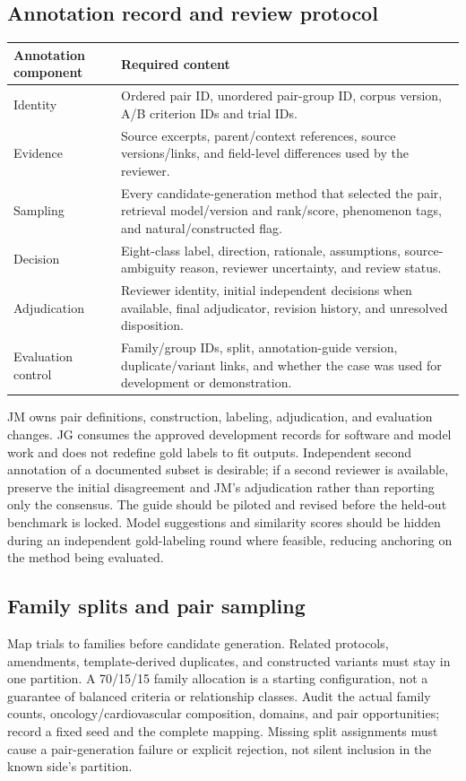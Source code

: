 \documentclass[10pt,letterpaper]{article}
\begin{document}
\subsection{Annotation record and review protocol}
\begin{longtable}{L{.26\linewidth}L{.66\linewidth}}
\toprule Annotation component & Required content\\\midrule
\endhead
Identity & Ordered pair ID, unordered pair-group ID, corpus version, A/B criterion IDs and trial IDs.\\
Evidence & Source excerpts, parent/context references, source versions/links, and field-level differences used by the reviewer.\\
Sampling & Every candidate-generation method that selected the pair, retrieval model/version and rank/score, phenomenon tags, and natural/constructed flag.\\
Decision & Eight-class label, direction, rationale, assumptions, source-ambiguity reason, reviewer uncertainty, and review status.\\
Adjudication & Reviewer identity, initial independent decisions when available, final adjudicator, revision history, and unresolved disposition.\\
Evaluation control & Family/group IDs, split, annotation-guide version, duplicate/variant links, and whether the case was used for development or demonstration.\\\bottomrule
\end{longtable}

JM owns pair definitions, construction, labeling, adjudication, and evaluation
changes. JG consumes the approved development records for software and model
work and does not redefine gold labels to fit outputs. Independent second
annotation of a documented subset is desirable; if a second reviewer is
available, preserve the initial disagreement and JM's adjudication rather
than reporting only the consensus. The guide should be piloted and revised
before the held-out benchmark is locked. Model suggestions and similarity
scores should be hidden during an independent gold-labeling round where
feasible, reducing anchoring on the method being evaluated.

\subsection{Family splits and pair sampling}
Map trials to families before candidate generation. Related protocols,
amendments, template-derived duplicates, and constructed variants must stay
in one partition. A 70/15/15 family allocation is a starting configuration,
not a guarantee of balanced criteria or relationship classes. Audit the
actual family counts, oncology/cardiovascular composition, domains, and
pair opportunities; record a fixed seed and the complete mapping.
Missing split assignments must cause a pair-generation failure or explicit
rejection, not silent inclusion in the known side's partition.
\end{document}
